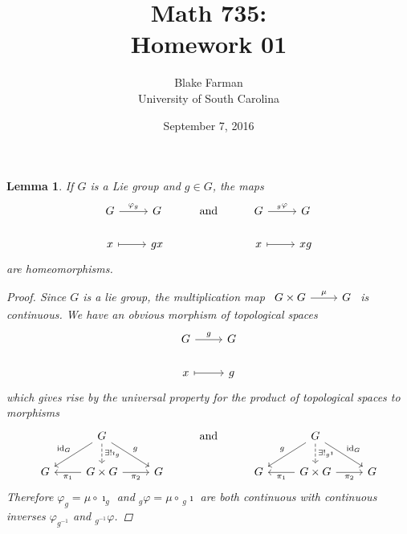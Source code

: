 \documentclass[10pt]{amsart}
\author{Blake Farman\\University of South Carolina}
\title{Math 735:\\Homework 01}
\date{September 7, 2016}
\begin{document}
\maketitle

\providecommand{\p}{\mathfrak{p}}
\providecommand{\m}{\mathfrak{m}}
\providecommand{\Deck}[1]{\operatorname{Deck}\left(#1\right)}
\newtheorem{thm}{Theorem}
\newtheorem{ex}{}
\newtheorem{lem}{Lemma}
\newtheorem{cor}{Corollary}
\newtheorem{prop}{Proposition}
\theoremstyle{definition}
\newtheorem{defn}{Definition}

\newcommand{\A}{\mathbb{A}}

\begin{lem}\label{lem1}
  If $G$ is a Lie group and $g \in G$, the maps
  $$\begin{tikzcd}
    G \arrow{r}{\varphi_g} & G & \text{and} & G \arrow{r}{_g\varphi} & G\\
    x \arrow[mapsto]{r} & gx & & x \arrow[mapsto]{r} & xg
  \end{tikzcd}$$
  are homeomorphisms.
  \begin{proof}
    Since $G$ is a lie group, the multiplication map 
    $\begin{tikzcd}
      G \times G \arrow{r}{\mu} & G 
    \end{tikzcd}$
      is continuous.
      We have an obvious morphism of topological spaces
      $$\begin{tikzcd}
        G \arrow{r}{g} & G\\
        x \arrow[mapsto]{r} & g
      \end{tikzcd}$$
      which gives rise by the universal property for the product of topological spaces to morphisms
      $$\begin{tikzcd}
        & G \arrow[swap]{ld}{\operatorname{id}_G} \arrow{rd}{g} \arrow[dashed]{d}{\exists !\imath_g} & &\text{and} & & G\arrow[swap]{ld}{g} \arrow{rd}{\operatorname{id}_G}\arrow[dashed]{d}{\exists ! _g\imath}\\
        G & \arrow{l}{\pi_1} G \times G \arrow[swap]{r}{\pi_2} & G & & G & \arrow{l}{\pi_1} G \times G \arrow[swap]{r}{\pi_2} & G
      \end{tikzcd}$$
      Therefore $\varphi_g = \mu \circ \imath_g$ and $_g\varphi = \mu \circ\,_g\imath$ are both continuous with continuous inverses $\varphi_{g^{-1}}$ and $_{g^{-1}}\varphi$.
  \end{proof}
\end{lem}
\end{document}
